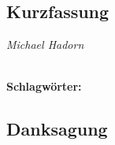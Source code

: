 
\subsection*{Kurzfassung}
\begin{flushright}
	\textit{Michael Hadorn}	
\end{flushright}




%
\mbox{}\\[0.5\baselineskip]\noindent
\textbf{Schlagwörter:} 

\vfill
\subsection*{Danksagung}
